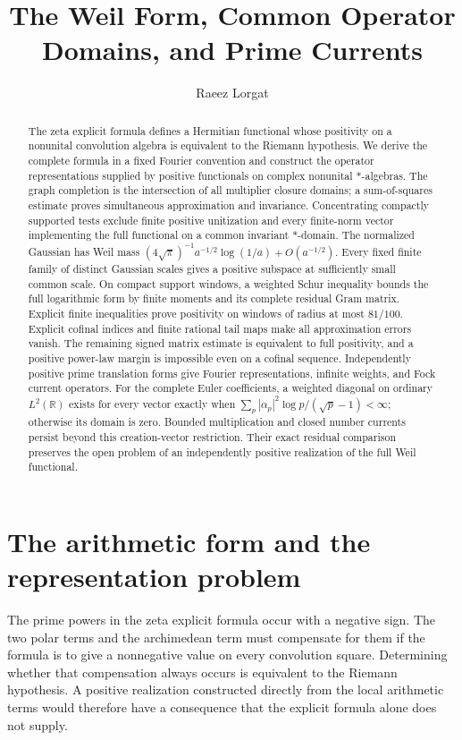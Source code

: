 \documentclass[11pt]{article}
\title{The Weil Form, Common Operator Domains, and Prime Currents}
\author{Raeez Lorgat}
\date{}
\theoremstyle{definition}
\theoremstyle{remark}
\numberwithin{equation}{section}
\newcommand{\R}{\mathbb R}
\begin{document}
\maketitle
\begin{abstract}
The zeta explicit formula defines a Hermitian functional whose positivity
on a nonunital convolution algebra is equivalent to the Riemann hypothesis.
We derive the complete formula in a fixed Fourier convention and construct
the operator representations supplied by positive functionals on
complex nonunital $*$-algebras.  The graph completion is the intersection of all
multiplier closure domains; a sum-of-squares estimate proves simultaneous
approximation and invariance.  Concentrating compactly supported tests
exclude finite positive unitization and every finite-norm vector
implementing the full functional on a common invariant $*$-domain.
The normalized Gaussian has Weil mass
$(4\sqrt\pi)^{-1}a^{-1/2}\log(1/a)+O(a^{-1/2})$.
Every fixed finite family of distinct Gaussian scales gives a positive
subspace at sufficiently small common scale.  On compact support windows,
a weighted Schur inequality bounds the full logarithmic form by finite
moments and its complete residual Gram matrix.  Explicit finite
inequalities prove positivity on windows of radius at most $81/100$.
Explicit cofinal indices
and finite rational tail maps make all approximation errors vanish.
The remaining signed matrix estimate is equivalent to full positivity,
and a positive power-law margin is impossible even on a cofinal sequence.
Independently positive prime translation forms give
Fourier representations, infinite weights, and Fock current operators.
For the complete Euler coefficients, a weighted diagonal on ordinary
$L^2(\R)$ exists for every vector exactly when
$\sum_p|\alpha_p|^2\log p/(\sqrt p-1)<\infty$; otherwise its domain is
zero.  Bounded multiplication and closed number currents persist beyond
this creation-vector restriction.  Their exact residual comparison
preserves the open problem of an independently positive realization of
the full Weil functional.
\end{abstract}
\tableofcontents
\clearpage


\section{The arithmetic form and the representation problem}
\label{sec:native-form}
\label{chap:weil-operator-domains}

The prime powers in the zeta explicit formula occur with a negative sign.
The two polar terms and the archimedean term must compensate for them if
the formula is to give a nonnegative value on every convolution square.
Determining whether that compensation always occurs is equivalent to the
Riemann hypothesis.  A positive realization constructed directly from the
local arithmetic terms would therefore have a consequence that the
explicit formula alone does not supply.
\end{document}
